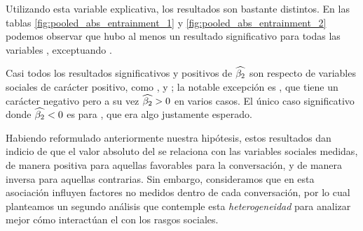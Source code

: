 Utilizando esta variable explicativa, los resultados son bastante distintos. En las tablas \ref{fig:pooled_abs_entrainment_1} y \ref{fig:pooled_abs_entrainment_2} podemos observar que hubo al menos un resultado significativo para todas las variables \ap, exceptuando \PHONAVG.

Casi todos los resultados significativos y positivos de $\widehat{\beta_2}$ son respecto de variables sociales de carácter positivo, como \svclear, \svengaged y \svencourages; la notable excepción es \svdifficult, que tiene un carácter negativo pero a su vez $\widehat{\beta_2} > 0$ en varios casos. El único caso significativo donde $\widehat{\beta_2} < 0$ es para \svbored, que era algo justamente esperado.

Habiendo reformulado anteriormente nuestra hipótesis, estos resultados dan indicio de que el valor absoluto del \entrainment se relaciona con las variables sociales medidas, de manera positiva para aquellas favorables para la conversación, y de manera inversa para aquellas contrarias. Sin embargo, consideramos que en esta asociación influyen factores no medidos dentro de cada conversación, por lo cual planteamos un segundo análisis que contemple esta \emph{heterogeneidad} para analizar mejor cómo interactúan el \entrainment con los rasgos sociales.





